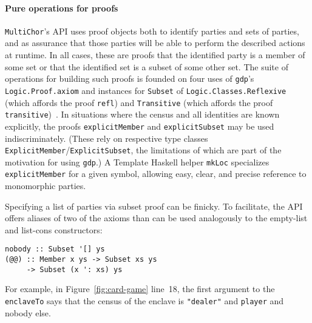 \documentclass[sigplan,screen]{acmart}
\newcommand{\inlinecode}[2][haskell]{\texttt{#2}}
\newcommand{\MultiChor}{\texttt{Multi\-Chor}\xspace}
\begin{document}
\paragraph{Pure operations for proofs}
\MultiChor's API uses proof objects both to identify parties and sets of parties,
and as assurance that those parties will be able to perform the described actions at runtime.
In all cases, these are proofs that the identified party is a member of some set
or that the identified set is a subset of some other set.
The suite of operations for building such proofs is founded on four uses of
\inlinecode[text]{gdp}'s \inlinecode{Logic.Proof.axiom}
and instances for \inlinecode{Subset} of \inlinecode{Logic.Classes.Reflexive}
(which affords the proof \inlinecode{refl})
and \inlinecode{Transitive} (which affords the proof \inlinecode{transitive})~\cite{gdp_hackage}.
In situations where the census and all identities are known explicitly,
the proofs \inlinecode{explicitMember} and \inlinecode{explicitSubset} may be used indiscriminately.
(These rely on respective type classes \inlinecode{ExplicitMember}/\inlinecode{ExplicitSubset},
the limitations of which are part of the motivation for using
\inlinecode[text]{gdp}.)
A Template Haskell helper \inlinecode{mkLoc} specializes \inlinecode{explicitMember} for a given 
symbol, allowing easy, clear, and precise reference to monomorphic parties.

Specifying a list of parties via subset proof can be finicky.
To facilitate, the API offers aliases of two of the axioms
than can be used analogously to the empty-list and list-cons constructors:
%
\begin{verbatim}
nobody :: Subset '[] ys
(@@) :: Member x ys -> Subset xs ys
     -> Subset (x ': xs) ys
\end{verbatim}
%
For example, in Figure~\ref{fig:card-game} line~18, the first argument to the
\inlinecode{enclaveTo}
says that the census of the enclave is
\inlinecode{"dealer"} and \inlinecode{player} and nobody else.
\end{document}
